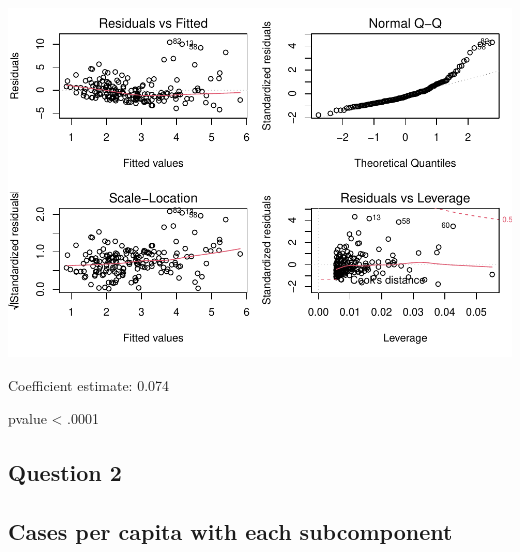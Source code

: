 \documentclass[
]{article}
\begin{document}
\includegraphics{Basic-Regression_files/figure-latex/unnamed-chunk-3-1.pdf}

Coefficient estimate: 0.074

pvalue \textless{} .0001

\hypertarget{question-2}{%
\subsection{Question 2}\label{question-2}}

\hypertarget{cases-per-capita-with-each-subcomponent}{%
\subsection{Cases per capita with each
subcomponent}\label{cases-per-capita-with-each-subcomponent}}
\end{document}

